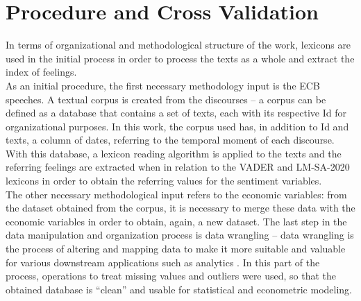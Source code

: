 



\section{Procedure and Cross Validation} \label{sec:cv}

In terms of organizational and methodological structure of the work, lexicons are used in the initial process in order to process the texts as a whole and extract the index of feelings.\\

As an initial procedure, the first necessary methodology input is the ECB speeches. A textual corpus is created from the discourses -- a corpus can be defined as a database that contains a set of texts, each with its respective Id for organizational purposes. In this work, the corpus used has, in addition to Id and texts, a column of dates, referring to the temporal moment of each discourse. With this database, a lexicon reading algorithm is applied to the texts and the referring feelings are extracted when in relation to the VADER and LM-SA-2020 lexicons in order to obtain the referring values for the sentiment variables.\\

The other necessary methodological input refers to the economic variables: from the dataset obtained from the corpus, it is necessary to merge these data with the economic variables in order to obtain, again, a new dataset. The last step in the data manipulation and organization process is data wrangling -- data wrangling is the process of altering and mapping data to make it more suitable and valuable for various downstream applications such as analytics \cite[]{dplyr2022, wickham2016r}. In this part of the process, operations to treat missing values and outliers were used, so that the obtained database is ``clean'' and usable for statistical and econometric modeling.\\

